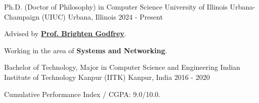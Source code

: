 

  \cventry
    {Ph.D. (Doctor of Philosophy) in Computer Science}
    {University of Illinois Urbana-Champaign (UIUC)}
    {Urbana, Illinois}
    {2024 - Present}
    {
      \begin{cvitems}
        \item Advised by \href{https://pbg.cs.illinois.edu/}{\textbf{Prof. Brighten Godfrey}}.
        \item Working in the area of \textbf{Systems and Networking}.
      \end{cvitems}
    }

  \cventry
    {Bachelor of Technology, Major in Computer Science and Engineering}
    {Indian Institute of Technology Kanpur (IITK)}
    {Kanpur, India}
    {2016 - 2020}
    {
      \begin{cvitems}
        \item Cumulative Performance Index / CGPA: 9.0/10.0.
      \end{cvitems}
    }

